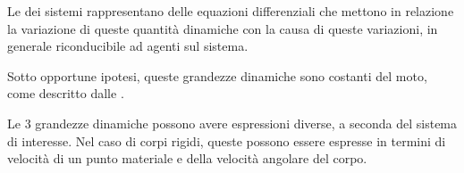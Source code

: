 \documentclass[letterpaper,10pt,italian]{jupyterBook}
\begin{document}
\sphinxAtStartPar
Le {\hyperref[\detokenize{ch/mechanics/dynamics-eom:physics-hs-mechanics-dynamics-eom}]{}} dei sistemi rappresentano delle equazioni differenziali che mettono in relazione la variazione di queste quantità dinamiche con la causa di queste variazioni, in generale riconducibile ad {\hyperref[\detokenize{ch/mechanics/actions:physics-hs-mechanics-actions}]{}} agenti sul sistema.

\sphinxAtStartPar
Sotto opportune ipotesi, queste grandezze dinamiche sono costanti del moto, come descritto dalle {\hyperref[\detokenize{ch/mechanics/dynamics-conservation:physics-hs-mechanics-dynamics-conservation}]{}}.

\sphinxAtStartPar
Le 3 grandezze dinamiche possono avere espressioni diverse, a seconda del sistema di interesse. Nel caso di corpi rigidi, queste possono essere espresse in termini di velocità di un punto materiale e della velocità angolare del corpo.

\sphinxstepscope
\end{document}
